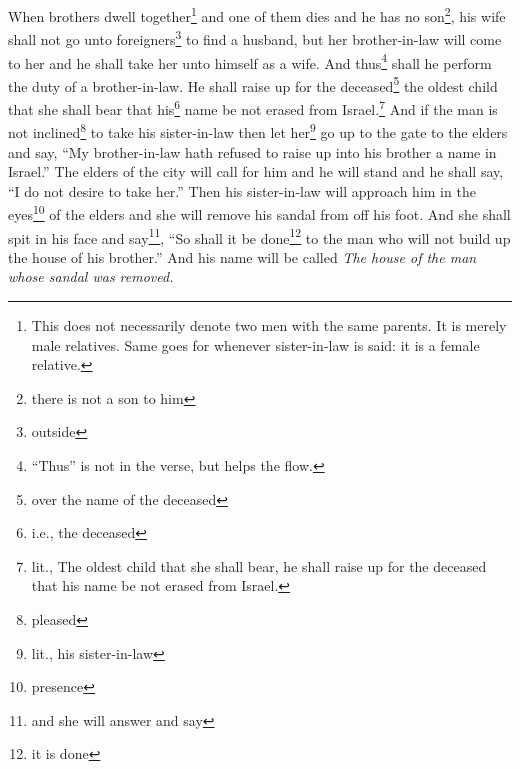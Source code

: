 
\begin{enumerate*}[mode=unboxed]
     When brothers dwell together\footnote{This does not necessarily denote two men with the same parents. It is merely male relatives. Same goes for whenever sister-in-law is said: it is a female relative.} and one of them dies and he has no son\footnote{there is not a son to him}, his wife shall not go unto foreigners\footnote{outside} to find a husband, but her brother-in-law will come to her and he shall take her unto himself as a wife. And thus\footnote{``Thus'' is not in the verse, but helps the flow.} shall he perform the duty of a brother-in-law.%
     He shall raise up for the deceased\footnote{over the name of the deceased} the oldest child that she shall bear that his\footnote{i.e., the deceased} name be not erased from Israel.\footnote{lit., The oldest child that she shall bear, he shall raise up for the deceased that his name be not erased from Israel.}%
     And if the man is not inclined\footnote{pleased} to take his sister-in-law then let her\footnote{lit., his sister-in-law} go up to the gate to the elders and say, ``My brother-in-law hath refused to raise up into his brother a name in Israel.''%
     The elders of the city will call for him and he will stand and he shall say, ``I do not desire to take her.''%
     Then his sister-in-law will approach him in the eyes\footnote{presence} of the elders and she will remove his sandal from off his foot. And she shall spit in his face and say\footnote{and she will answer and say}, ``So shall it be done\footnote{it is done} to the man who will not build up the house of his brother.''%
     And his name will be called \textit{The house of the man whose sandal was removed.}%
\end{enumerate*}
